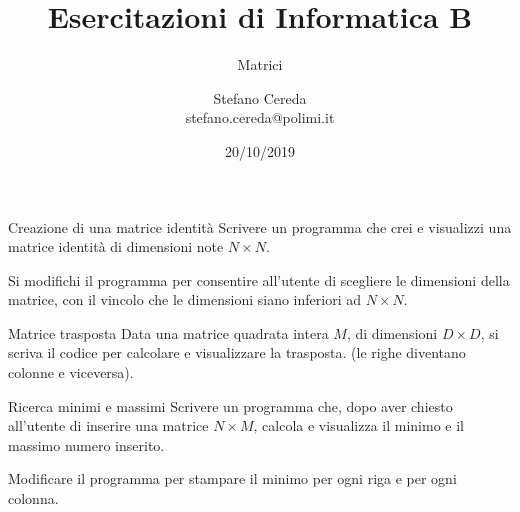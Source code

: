 \documentclass[aspectratio=169, ]{beamer}
\title{Esercitazioni di Informatica B}
\subtitle{Matrici}
\author{Stefano Cereda\\
	stefano.cereda@polimi.it
}
\date{20/10/2019}
\institute[PoliMi]{Politecnico Milano}
\begin{document}
	\begin{frame}
	\maketitle
    \end{frame}


\begin{frame}{Creazione di una matrice identità}
Scrivere un programma che crei e visualizzi una matrice identità di dimensioni note $N \times N$.

\pause
Si modifichi il programma per consentire all'utente di scegliere le dimensioni della matrice, con il vincolo che le
    dimensioni siano inferiori ad $N \times N$.
\end{frame}

\begin{frame}{Matrice trasposta}
Data una matrice quadrata intera $M$, di dimensioni $D \times D$, si scriva il codice per calcolare e visualizzare la trasposta. (le righe diventano colonne e viceversa).
\end{frame}

\begin{frame}{Ricerca minimi e massimi}
    Scrivere un programma che, dopo aver chiesto all'utente di inserire una matrice $N \times M$, calcola e visualizza
    il minimo e il massimo numero inserito.

    \pause
    Modificare il programma per stampare il minimo per ogni riga e per ogni colonna.
\end{frame}



\end{document}
